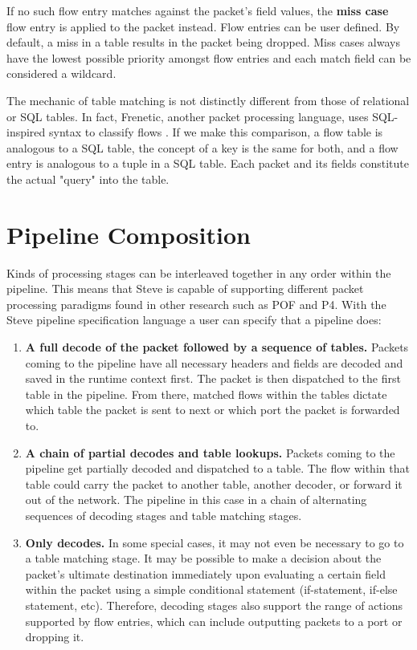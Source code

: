 If no such flow entry matches against the packet's field values, the \textbf{miss case} flow entry is applied to the packet instead. Flow entries can be user defined. By default, a miss in a table results in the packet being dropped. Miss cases always have the lowest possible priority amongst flow entries and each match field can be considered a wildcard.

The mechanic of table matching is not distinctly different from those of relational or SQL tables. In fact, Frenetic, another packet processing language, uses SQL-inspired syntax to classify flows \cite{frenetic_paper1}. If we make this comparison, a flow table is analogous to a SQL table, the concept of a key is the same for both, and a flow entry is analogous to a tuple in a SQL table. Each packet and its fields constitute the actual "query" into the table.

\section{Pipeline Composition} \label{pipeline_comp_desc}

Kinds of processing stages can be interleaved together in any order within the pipeline. This means that Steve is capable of supporting different packet processing paradigms found in other research such as POF and P4. With the Steve pipeline specification language a user can specify that a pipeline does:

\begin{enumerate}
\item \textbf{A full decode of the packet followed by a sequence of tables.} Packets coming to the pipeline have all necessary headers and fields are decoded and saved in the runtime context first. The packet is then dispatched to the first table in the pipeline. From there, matched flows within the tables dictate which table the packet is sent to next or which port the packet is forwarded to.
\item \textbf{A chain of partial decodes and table lookups.} Packets coming to the pipeline get partially decoded and dispatched to a table. The flow within that table could carry the packet to another table, another decoder, or forward it out of the network. The pipeline in this case in a chain of alternating sequences of decoding stages and table matching stages.
\item \textbf{Only decodes.} In some special cases, it may not even be necessary to go to a table matching stage. It may be possible to make a decision about the packet’s ultimate destination immediately upon evaluating a certain field within the packet using a simple conditional statement (if-statement, if-else statement, etc). Therefore, decoding stages also support the range of actions supported by flow entries, which can include outputting packets to a port or dropping it.
\end{enumerate}

